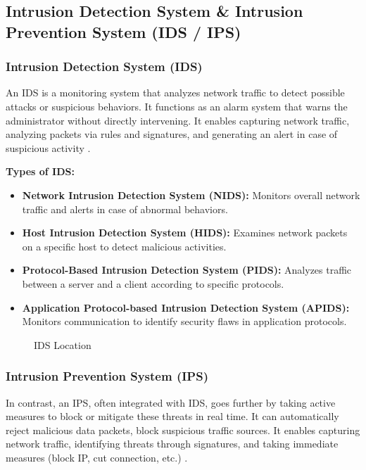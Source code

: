 \subsection{Intrusion Detection System \& Intrusion Prevention System (IDS / IPS)}
\label{subsec:ids-ips}

\subsubsection{Intrusion Detection System (IDS)}

An IDS is a monitoring system that analyzes network traffic to detect possible attacks or suspicious behaviors. It functions as an alarm system that warns the administrator without directly intervening. It enables capturing network traffic, analyzing packets via rules and signatures, and generating an alert in case of suspicious activity \cite{ref35}.

\textbf{Types of IDS:}

\begin{itemize}
    \item \textbf{Network Intrusion Detection System (NIDS):} Monitors overall network traffic and alerts in case of abnormal behaviors.
    \item \textbf{Host Intrusion Detection System (HIDS):} Examines network packets on a specific host to detect malicious activities.
    \item \textbf{Protocol-Based Intrusion Detection System (PIDS):} Analyzes traffic between a server and a client according to specific protocols.
    \item \textbf{Application Protocol-based Intrusion Detection System (APIDS):} Monitors communication to identify security flaws in application protocols.
\end{itemize}

\begin{figure}[H]
\centering
{}
\caption{IDS Location}
\label{fig:ids}
\end{figure}

\subsubsection{Intrusion Prevention System (IPS)}

In contrast, an IPS, often integrated with IDS, goes further by taking active measures to block or mitigate these threats in real time. It can automatically reject malicious data packets, block suspicious traffic sources. It enables capturing network traffic, identifying threats through signatures, and taking immediate measures (block IP, cut connection, etc.) \cite{ref35}.

